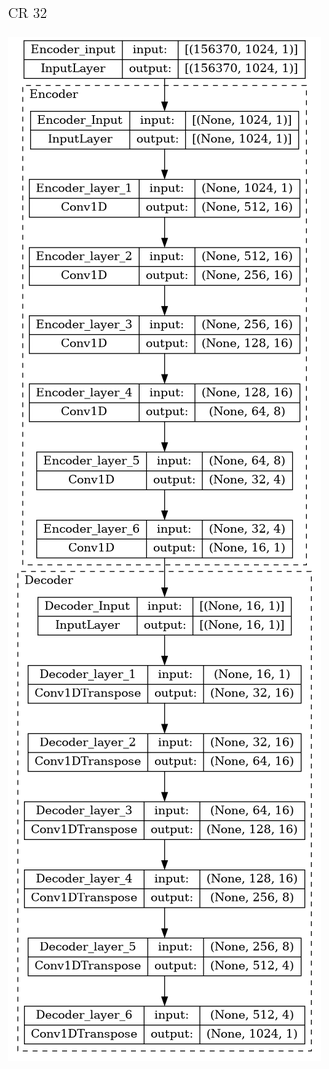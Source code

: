 \begin{appendices}
\begin{figure}
\begin{subfigure}{.49\textwidth}
			\caption{CR 32}
		\end{subfigure}
		\begin{subfigure}{.49\textwidth}
			\includegraphics[width=\linewidth,height=\textheight]{../../Images/CR_64.png}

\end{subfigure}
\end{figure}
\end{appendices}

